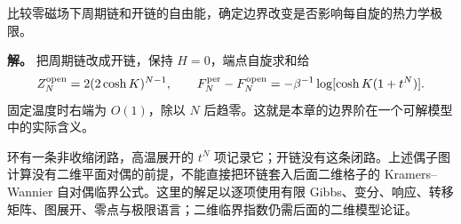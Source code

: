 \begin{exbox}
比较零磁场下周期链和开链的自由能，确定边界改变是否影响每自旋的热力学极限。

\textbf{解。} 把周期链改成开链，保持 $H=0$，端点自旋求和给
\[
Z_N^{\rm open}=2(2\cosh K)^{N-1},\qquad
F_N^{\rm per}-F_N^{\rm open}
=-\beta^{-1}\log[\cosh K(1+t^N)].
\]
固定温度时右端为 $O(1)$，除以 $N$ 后趋零。这就是本章的边界阶在一个可解模型中的实际含义。

环有一条非收缩闭路，高温展开的 $t^N$ 项记录它；开链没有这条闭路。上述偶子图计算没有二维平面对偶的前提，不能直接把环链套入后面二维格子的 Kramers--Wannier 自对偶临界公式。这里的解足以逐项使用有限 Gibbs、变分、响应、转移矩阵、图展开、零点与极限语言；二维临界指数仍需后面的二维模型论证。
\end{exbox}
